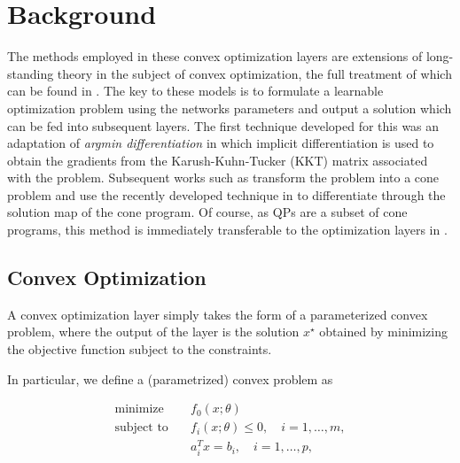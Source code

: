 \documentclass{article}
\begin{document}
\section{Background}

The methods employed in these convex optimization layers are extensions of long-standing theory in the subject of convex optimization, the full treatment of which can be found in \citet{boyd2004convex}. The key to these models is to formulate a learnable optimization problem using the networks parameters and output a solution which can be fed into subsequent layers. The first technique developed for this was an adaptation of \textit{argmin differentiation} in which implicit differentiation is used to obtain the gradients from the Karush-Kuhn-Tucker (KKT) matrix associated with the problem. Subsequent works such as \citet{differentiableconvexoptimizationlayers} transform the problem into a cone problem and use the recently developed technique in \citet{conedifferentiation} to differentiate through the solution map of the cone program. Of course, as QPs are a subset of cone programs, this method is immediately transferable to the optimization layers in \citet{optnet}.

\subsection{Convex Optimization}

A convex optimization layer simply takes the form of a parameterized convex problem, where the output of the layer is the solution \(x^\star\) obtained by minimizing the objective function subject to the constraints.

In particular, we define a (parametrized) convex problem as

\begin{equation}
\begin{aligned}
    \text{minimize} \quad & f_0(x; \theta) \\
    \text{subject to} \quad & f_i(x; \theta) \leq 0, \quad i = 1, \ldots, m, \\
    & a_i^T x = b_i, \quad i = 1, \ldots, p,
\end{aligned}
\end{equation}
\end{document}

